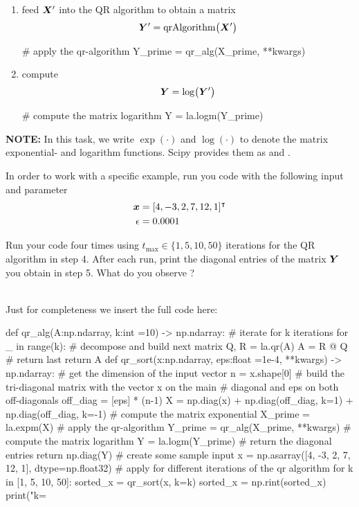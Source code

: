 \begin{enumerate}
\item feed $\bm{X}'$ into the QR algorithm to obtain a matrix
\begin{equation*}
\bm{Y}' = \operatorname*{qrAlgorithm} \bigl( \bm{X}' \bigr)
\end{equation*}
\begin{python}
# apply the qr-algorithm
Y_prime = qr_alg(X_prime, **kwargs)
\end{python}

\item compute 
\begin{equation*}
\bm{Y} = \log \bigl( \bm{Y}' \bigr)
\end{equation*}
\begin{python}
# compute the matrix logarithm
Y = la.logm(Y_prime)
\end{python}
\end{enumerate}

\textbf{NOTE:} In this task, we write $\exp(\cdot)$ and $\log(\cdot)$ to denote the matrix exponential- and logarithm functions. Scipy provides them as  and .

In order to work with a specific example, run you code with the following input and parameter
\begin{align*}
\bm{x}  & = [ 4, -3, 2, 7, 12, 1 ]^\intercal \\
\epsilon & = 0.0001
\end{align*}

Run your code four times using $t_{\text{max}} \in \{ 1, 5, 10, 50 \}$ iterations for the QR algorithm in step 4. After each run, print the diagonal entries of the matrix $\bm{Y}$ you obtain in step 5. What do you observe ?

\color{blue} \\[1ex]

Just for completeness we insert the full code here:

\color{black}
\begin{python}
def qr_alg(A:np.ndarray, k:int =10) -> np.ndarray:
    # iterate for k iterations
    for _ in range(k):
        # decompose and build next matrix
        Q, R = la.qr(A)
        A = R @ Q
    # return last
    return A
def qr_sort(x:np.ndarray, eps:float =1e-4, **kwargs) -> np.ndarray:
    # get the dimension of the input vector
    n = x.shape[0]
    # build the tri-diagonal matrix with the vector x on the main
    # diagonal and eps on both off-diagonals
    off_diag = [eps] * (n-1)
    X = np.diag(x) + np.diag(off_diag, k=1) + np.diag(off_diag, k=-1)
    # compute the matrix exponential
    X_prime = la.expm(X)
    # apply the qr-algorithm
    Y_prime = qr_alg(X_prime, **kwargs)
    # compute the matrix logarithm
    Y = la.logm(Y_prime)
    # return the diagonal entries
    return np.diag(Y)
# create some sample input
x = np.asarray([4, -3, 2, 7, 12, 1], dtype=np.float32)
# apply for different iterations of the qr algorithm
for k in [1, 5, 10, 50]:
    sorted_x = qr_sort(x, k=k)
    sorted_x = np.rint(sorted_x)
    print("k=%
\end{python}
\color{blue}


